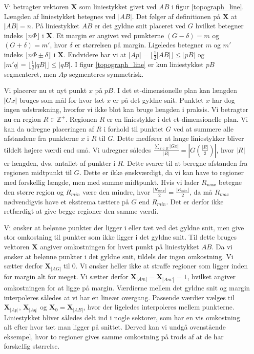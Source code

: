 {Vi betragter vektoren $\mathbf{X}$ som liniestykket givet ved $AB$ i
figur \ref{topograph_line}. Længden af liniestykket betegnes ved $|AB|$.
Det følger af definitionen på $\mathbf{X}$ at $|AB| = n$. På liniestykket $AB$
er det gyldne snit placeret ved $G$ hvilket betegner indeks $\lfloor
n\varPhi \rfloor$ i $\mathbf{X}$. Et margin er angivet ved punkterne $(G
- \delta) = m$ og $(G + \delta) = m'$, hvor $\delta$ er størrelsen på
margin. Ligeledes betegner $m$ og $m'$ indeks $\lfloor n \varPhi \pm
\delta \rfloor$ i $\mathbf{X}$.  Endvidere har vi at $|Ap| = \lfloor
\frac{1}{2}|AB| \rfloor \leq |pB|$ og $|m'q| = \lfloor \frac{1}{2}|qB|
\rfloor \leq |qB|$. I figur \ref{topograph_line} er kun liniestykket
$pB$ segmenteret, men $Ap$ segmenteres symmetrisk.

Vi placerer nu et nyt punkt $x$ på $pB$. I det et-dimensionelle plan kan
længden $|Gx|$ bruges som mål for hvor tæt $x$ er på det gyldne snit.
Punktet $x$ har dog ingen udstrækning, hvorfor vi ikke blot kan bruge
længden i praksis. Vi betragter nu en region $R \in \mathbb{Z}^{+}$.
Regionen $R$ er en liniestykke i det et-dimensionelle plan. Vi kan da
udregne placeringen af $R$ i forhold til punktet $G$ ved at summere alle
afstandene fra punkterne $x$ i $R$ til $G$.  Dette medfører at lange
liniestykker bliver tildelt højere værdi end små. Vi udregner således
$\frac{\sum_{x \in R}{|Gx|}}{|R|} = |G(\frac{|R|}{2})|$, hvor $|R|$ er
længden, dvs. antallet af punkter i $R$. Dette svarer til at beregne
afstanden fra regionen midtpunkt til $G$. Dette er ikke ønskværdigt, da
vi kan have to regioner med forskellig længde, men med samme midtpunkt.
Hvis vi lader $R_{max}$ betegne den større region og $R_{min}$ være den
mindre, hvor $ \frac{|R_{max}|}{2} = \frac{|R_{min}|}{2}$, da må
$R_{max}$ nødvendigvis have et ekstrema tættere på $G$ end $R_{min}$.
Det er derfor ikke retfærdigt at give begge regioner den samme værdi.

Vi ønsker at belønne punkter der ligger i eller tæt ved det gyldne snit,
men give stor omkostning til punkter som ikke ligger i det gyldne snit.
Til dette bruges vektoren $\mathbf{X}$ angiver omkostningen for hvert
punkt på liniestykket $AB$. Da vi ønsker at belønne punkter i det gyldne
snit, tildels der ingen omkostning. Vi sætter derfor $\mathbf{X}_{|AG|}$
til $0$. Vi ønsker heller ikke at straffe regioner som ligger inden for
margin alt for meget. Vi sætter derfor $\mathbf{X}_{|Am|} =
\mathbf{X}_{|Am'|} = 1$, hvilket angiver omkostningen for at ligge på
margin. Værdierne mellem det gyldne snit og margin interpoleres således
at vi har en lineær overgang. Passende værdier vælges til
$\mathbf{X}_{|Ap|}$, $\mathbf{X}_{|Aq|}$ og $\mathbf{X}_{0} =
\mathbf{X}_{|AB|}$, hvor der ligeledes interpoleres mellem punkterne.
Liniestykket bliver således delt ind i nogle sektorer, som har en vis
omkostning alt efter hvor tæt man ligger på snittet. Derved kan vi undgå
ovenstående eksempel, hvor to regioner gives samme omkostning på trods
af at de har forskellig størrelse.

}
